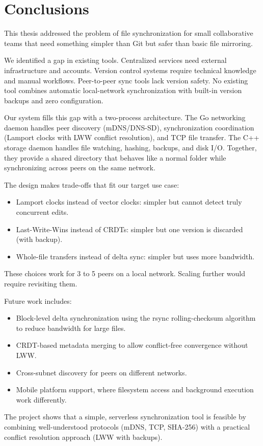 \chapter{Conclusions}

This thesis addressed the problem of file synchronization for small collaborative teams that need something simpler than Git but safer than basic file mirroring.

We identified a gap in existing tools. Centralized services need external infrastructure and accounts. Version control systems require technical knowledge and manual workflows. Peer-to-peer sync tools lack version safety. No existing tool combines automatic local-network synchronization with built-in version backups and zero configuration.

Our system fills this gap with a two-process architecture. The Go networking daemon handles peer discovery (mDNS/DNS-SD), synchronization coordination (Lamport clocks with LWW conflict resolution), and TCP file transfer. The C++ storage daemon handles file watching, hashing, backups, and disk I/O. Together, they provide a shared directory that behaves like a normal folder while synchronizing across peers on the same network.

The design makes trade-offs that fit our target use case:

\begin{itemize}
    \item Lamport clocks instead of vector clocks: simpler but cannot detect truly concurrent edits.
    \item Last-Write-Wins instead of CRDTs: simpler but one version is discarded (with backup).
    \item Whole-file transfers instead of delta sync: simpler but uses more bandwidth.
\end{itemize}

These choices work for 3 to 5 peers on a local network. Scaling further would require revisiting them.

Future work includes:

\begin{itemize}
    \item Block-level delta synchronization using the rsync rolling-checksum algorithm to reduce bandwidth for large files.
    \item CRDT-based metadata merging to allow conflict-free convergence without LWW.
    \item Cross-subnet discovery for peers on different networks.
    \item Mobile platform support, where filesystem access and background execution work differently.
\end{itemize}

The project shows that a simple, serverless synchronization tool is feasible by combining well-understood protocols (mDNS, TCP, SHA-256) with a practical conflict resolution approach (LWW with backups).
